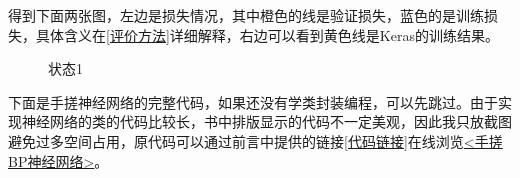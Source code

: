 \documentclass[a5paper, 11pt, openany]{book}
\begin{document}
得到下面两张图，左边是损失情况，其中橙色的线是验证损失，蓝色的是训练损失，具体含义在\ref{评价方法}详细解释，右边可以看到黄色线是Keras的训练结果。

\begin{figure}[ht]
    \centering
    \caption{状态1}\label{状态1}
\end{figure}



下面是手搓神经网络的完整代码，如果还没有学类封装编程，可以先跳过。由于实现神经网络的类的代码比较长，书中排版显示的代码不一定美观，因此我只放截图避免过多空间占用，原代码可以通过前言中提供的链接\ref{代码链接}在线浏览\href{https://github.com/Aegis1863/ML_practice/blob/master/机器学习笔记/X_01_手搓BP神经网络.ipynb}{<手搓BP神经网络>}。

\newpage
\end{document}
